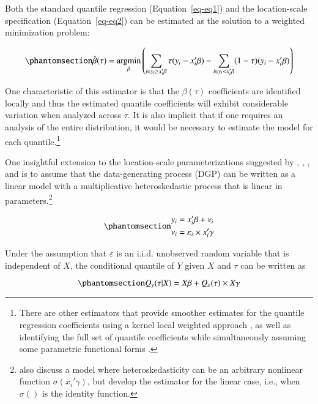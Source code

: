 \documentclass[
  authoryear,
  review,
  1p]{elsarticle}
\begin{document}
Both the standard quantile regression (Equation~\ref{eq-eq1}) and the
location-scale specification (Equation~\ref{eq-eq2}) can be estimated as
the solution to a weighted minimization problem:

\begin{equation}\phantomsection\label{eq-eq3}{\hat{\beta}(\tau) = \underset{\beta}{\operatorname{argmin}}
\left( \sum_{i\in y_i\geq x_i'\beta} \tau (y_i - x_i'\beta) - \sum_{i\in y_i<x_i'\beta} (1-\tau)(y_i - x_i'\beta) \right)
}\end{equation}

One characteristic of this estimator is that the \(\beta(\tau)\)
coefficients are identified locally and thus the estimated quantile
coefficients will exhibit considerable variation when analyzed across
\(\tau\). It is also implicit that if one requires an analysis of the
entire distribution, it would be necessary to estimate the model for
each quantile.\footnote{There are other estimators that provide smoother
  estimates for the quantile regression coefficients using a kernel
  local weighted approach \citep{kaplan2017}, as well as identifying the
  full set of quantile coefficients while simultaneously assuming some
  parametric functional forms \citep{frumentobotai2016}.}

One insightful extension to the location-scale parameterizations
suggested by \citet{he1997}, \citet{zhao2000}, \citet{cameron2005}, and
\citet{mss2019} is to assume that the data-generating process (DGP) can
be written as a linear model with a multiplicative heteroskedastic
process that is linear in parameters.\footnote{\citet{mss2019} also
  discuss a model where heteroskedasticity can be an arbitrary nonlinear
  function \(\sigma(x_i'\gamma)\), but develop the estimator for the
  linear case, i.e., when \(\sigma()\) is the identity function.}

\begin{equation}\phantomsection\label{eq-eq4}{\begin{aligned}
y_i &=x_i'\beta+\nu_i \\
\nu_i &=\varepsilon_i \times x_i'\gamma 
\end{aligned}
}\end{equation}

Under the assumption that \(\varepsilon\) is an i.i.d. unobserved random
variable that is independent of \(X\), the conditional quantile of \(Y\)
given \(X\) and \(\tau\) can be written as

\begin{equation}\phantomsection\label{eq-eq5}{Q_y(\tau|X) =X\beta+Q_\varepsilon(\tau) \times X\gamma 
}\end{equation}
\end{document}

